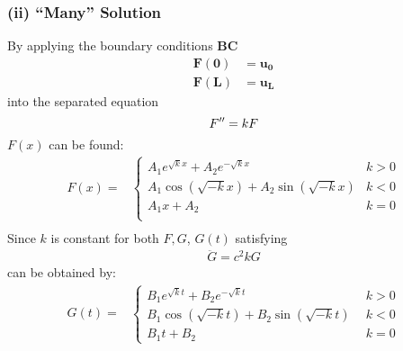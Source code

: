 \subsubsection{(ii) ``Many'' Solution}
By applying the boundary conditions \textbf{BC}
\begin{align*}
    \mathbf{F(0)} & =\mathbf{u_0} \\
    \mathbf{F(L)} & =\mathbf{u_L}
\end{align*}
into the separated equation
\begin{equation*}
    F''=kF \\
\end{equation*}
$F(x)$ can be found:
\begin{align*}
    F(x)= &
    \begin{cases}
        A_1e^{\sqrt{k}x}+A_2e^{-\sqrt{k}x}      & k>0 \\
        A_1\cos(\sqrt{-k}x)+A_2\sin(\sqrt{-k}x) & k<0 \\
        A_1x+A_2                                & k=0 \\
    \end{cases} \\
\end{align*}
Since $k$ is constant for both $F,G$, $G(t)$ satisfying
\begin{align*}
    \ddot{G}=c^2kG
\end{align*}
can be obtained by:
\begin{align*}
    G(t)= &
    \begin{cases}
        B_1e^{\sqrt{k}t}+B_2e^{-\sqrt{k}t}      & \;\,k>0 \\
        B_1\cos(\sqrt{-k}t)+B_2\sin(\sqrt{-k}t) & \;\,k<0 \\
        B_1t+B_2                                & \;\,k=0
    \end{cases}
\end{align*}


